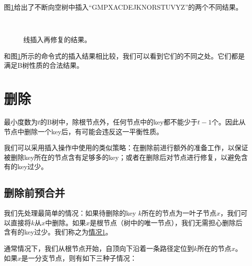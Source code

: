\documentclass[UTF8]{article}
\begin{document}
图\ref{fig:btree-insert-fp}给出了不断向空树中插入“GMPXACDEJKNORSTUVYZ”的两个不同结果。

\begin{figure}[htbp]
  \centering
   \\
    \caption{线插入再修复的结果。} \label{fig:btree-insert-fp}
\end{figure}

和图\ref{fig:btree-insert-fp}所示的命令式的插入结果相比较，我们可以看到它们的不同之处。它们都是满足B树性质的合法结果。


\section{删除}

最小度数为$t$的B树中，除根节点外，任何节点中的key都不能少于$t-1$个。因此从节点中删除一个key后，有可能会违反这一平衡性质。

我们可以采用插入操作中使用的类似策略：在删除前进行额外的准备工作，以保证被删除key所在的节点含有足够多的key；或者在删除后对节点进行修复，以避免含有的key过少。


\subsection{删除前预合并}

我们先处理最简单的情况：如果待删除的key $k$所在的节点为一叶子节点$x$，我们可以直接将$k$从$x$中删除。如果$x$是根节点（树中的唯一节点），我们无需担心删除后含有的key过少。我们称之为\underline{情况1}。

通常情况下，我们从根节点开始，自顶向下沿着一条路径定位到$k$所在的节点$x$。如果$x$是一分支节点，则有如下三种子情况：
\end{document}
